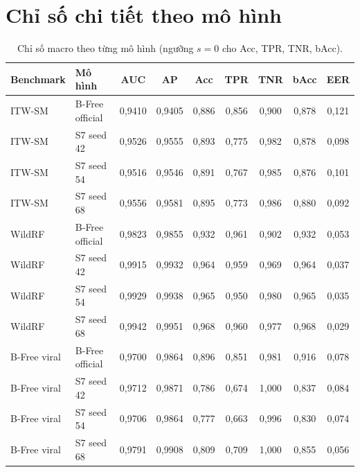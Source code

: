 \documentclass[11pt,a4paper]{article}
\begin{document}
\section{Chỉ số chi tiết theo mô hình}
\begin{table}[H]\centering\scriptsize
\caption{Chỉ số macro theo từng mô hình (ngưỡng $s=0$ cho Acc, TPR, TNR, bAcc).}
\begin{tabular}{llccccccc}
\toprule
Benchmark & Mô hình & AUC & AP & Acc & TPR & TNR & bAcc & EER \\
\midrule
ITW-SM & B-Free official & 0,9410 & 0,9405 & 0,886 & 0,856 & 0,900 & 0,878 & 0,121 \\
ITW-SM & S7 seed 42 & 0,9526 & 0,9555 & 0,893 & 0,775 & 0,982 & 0,878 & 0,098 \\
ITW-SM & S7 seed 54 & 0,9516 & 0,9546 & 0,891 & 0,767 & 0,985 & 0,876 & 0,101 \\
ITW-SM & S7 seed 68 & 0,9556 & 0,9581 & 0,895 & 0,773 & 0,986 & 0,880 & 0,092 \\
\midrule
WildRF & B-Free official & 0,9823 & 0,9855 & 0,932 & 0,961 & 0,902 & 0,932 & 0,053 \\
WildRF & S7 seed 42 & 0,9915 & 0,9932 & 0,964 & 0,959 & 0,969 & 0,964 & 0,037 \\
WildRF & S7 seed 54 & 0,9929 & 0,9938 & 0,965 & 0,950 & 0,980 & 0,965 & 0,035 \\
WildRF & S7 seed 68 & 0,9942 & 0,9951 & 0,968 & 0,960 & 0,977 & 0,968 & 0,029 \\
\midrule
B-Free viral & B-Free official & 0,9700 & 0,9864 & 0,896 & 0,851 & 0,981 & 0,916 & 0,078 \\
B-Free viral & S7 seed 42 & 0,9712 & 0,9871 & 0,786 & 0,674 & 1,000 & 0,837 & 0,084 \\
B-Free viral & S7 seed 54 & 0,9706 & 0,9864 & 0,777 & 0,663 & 0,996 & 0,830 & 0,074 \\
B-Free viral & S7 seed 68 & 0,9791 & 0,9908 & 0,809 & 0,709 & 1,000 & 0,855 & 0,056 \\
\bottomrule
\end{tabular}
\end{table}
\end{document}
